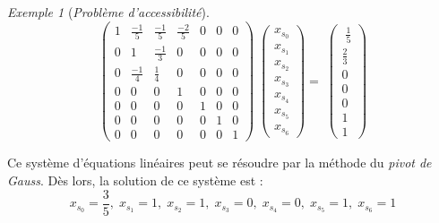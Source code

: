 \documentclass[12pt,a4paper]{report}
\theoremstyle{definition}%
\theoremstyle{remark}
\newtheorem{example}{Exemple}[chapter]
\begin{document}
\begin{example}[\textit{Problème d'accessibilité}]
\[
\begin{pmatrix}
1 & \frac{-1}{5} & \frac{-1}{5} & \frac{-2}{5} & 0 & 0 & 0 \\[0.3em]
0 & 1 & \frac{-1}{3} & 0 & 0 & 0 & 0 \\[0.3em]
0 & \frac{-1}{4} & \frac{1}{4} & 0 & 0 & 0 & 0 \\[0.3em]
0 & 0 & 0 & 1 & 0 & 0 & 0 \\[0.3em]
0 & 0 & 0 & 0 & 1 & 0 & 0 \\[0.3em]
0 & 0 & 0 & 0 & 0 & 1 & 0 \\[0.3em]
0 & 0 & 0 & 0 & 0 & 0 & 1
\end{pmatrix}
\;
\begin{pmatrix}
x_{s_0} \\[0.3em] x _{s_1} \\[0.3em] x_{s_2} \\[0.3em] x_{s_3} \\[0.3em] x_{s_4} \\[0.3em] x_{s_5} \\[0.3em] x_{s_6}
\end{pmatrix}
 = \;
\begin{pmatrix}
\; \frac{1}{5} \\[0.3em] \frac{2}{3} \\[0.3em] 0 \\[0.3em] 0 \\[0.3em] 0 \\[0.3em] 1 \\[0.3em] 1
\end{pmatrix}
\]

Ce système d'équations linéaires peut se résoudre par la méthode du \textit{pivot de Gauss}. %
Dès lors, la solution de ce système est :
\[
	x_{s_0} = \frac{3}{5}, \; x_{s_1} = 1, \; x_{s_2} = 1, \; x_{s_3} = 0, \; x_{s_4} = 0, \; x_{s_5} = 1, \; x_{s_6} = 1
\]
\end{example}
\end{document}
